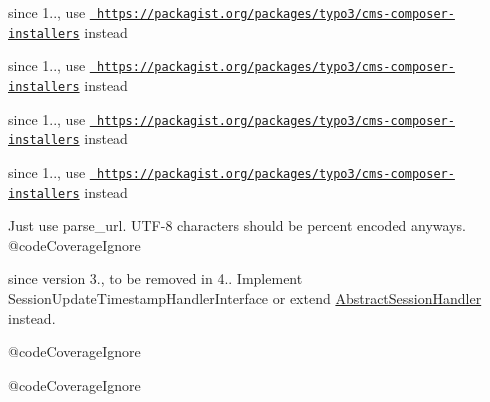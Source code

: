 \begin{DoxyRefList}
\label{deprecated__deprecated000062}%
%
since 1.., use \href{https://packagist.org/packages/typo3/cms-composer-installers}{\texttt{ https\+://packagist.\+org/packages/typo3/cms-\/composer-\/installers}} instead

\label{deprecated__deprecated000063}%
%
since 1.., use \href{https://packagist.org/packages/typo3/cms-composer-installers}{\texttt{ https\+://packagist.\+org/packages/typo3/cms-\/composer-\/installers}} instead

\label{deprecated__deprecated000064}%
%
since 1.., use \href{https://packagist.org/packages/typo3/cms-composer-installers}{\texttt{ https\+://packagist.\+org/packages/typo3/cms-\/composer-\/installers}} instead

\label{deprecated__deprecated000065}%
%
since 1.., use \href{https://packagist.org/packages/typo3/cms-composer-installers}{\texttt{ https\+://packagist.\+org/packages/typo3/cms-\/composer-\/installers}} instead 
\item[Global \mbox{\hyperlink{class_omnipay_1_1_stripe_1_1_message_1_1_update_subscription_request_a435e51142670c3f2b7b4ed81e6d1c6d2}{Update\+Subscription\+Request\+::get\+Plan\+Id}} ()]\label{deprecated__deprecated000039}%
%
  
\item[Global \mbox{\hyperlink{class_omnipay_1_1_stripe_1_1_message_1_1_update_subscription_request_a315185c47bc5d76948c09ddbc0335e74}{Update\+Subscription\+Request\+::set\+Plan\+Id}} (\$value)]\label{deprecated__deprecated000040}%
%
  
\item[Class \mbox{\hyperlink{class_guzzle_1_1_parser_1_1_url_1_1_url_parser}{Url\+Parser}} ]\label{deprecated__deprecated000028}%
%
Just use parse\+\_\+url. UTF-\/8 characters should be percent encoded anyways. @code\+Coverage\+Ignore  
\item[Class \mbox{\hyperlink{class_symfony_1_1_component_1_1_http_foundation_1_1_session_1_1_storage_1_1_handler_1_1_write_check_session_handler}{Write\+Check\+Session\+Handler}} ]\label{deprecated__deprecated000058}%
%
since version 3., to be removed in 4.. Implement {\ttfamily Session\+Update\+Timestamp\+Handler\+Interface} or extend {\ttfamily \mbox{\hyperlink{class_symfony_1_1_component_1_1_http_foundation_1_1_session_1_1_storage_1_1_handler_1_1_abstract_session_handler}{Abstract\+Session\+Handler}}} instead.  
\item[Class \mbox{\hyperlink{class_guzzle_1_1_cache_1_1_zf1_cache_adapter}{Zf1\+Cache\+Adapter}} ]\label{deprecated__deprecated000003}%
%
 @code\+Coverage\+Ignore  
\item[Class \mbox{\hyperlink{class_guzzle_1_1_log_1_1_zf1_log_adapter}{Zf1\+Log\+Adapter}} ]\label{deprecated__deprecated000027}%
%
 @code\+Coverage\+Ignore 
\end{DoxyRefList}